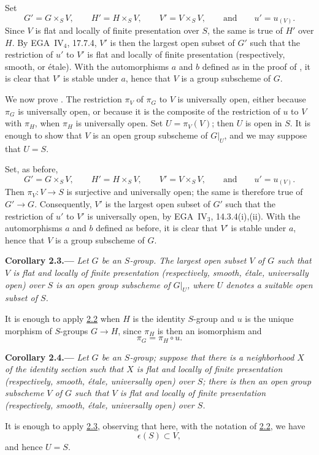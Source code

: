 Set
\[
  G'=G\times_SV,\qquad
  H'=H\times_SV,\qquad
  V'=V\times_SV,
  \qquad\text{and}\qquad
  u'=u_{(V)}.
\]
Since \(V\) is flat and locally of finite presentation over \(S\),
the same is true of \(H'\) over \(H\). By EGA~IV\(_4\), 17.7.4,
\(V'\) is then the largest open subset of \(G'\) such that the
restriction of \(u'\) to \(V'\) is flat and locally of finite
presentation (respectively, smooth, or \'etale). With the
automorphisms \(a\) and \(b\) defined as in the proof of , it
is clear that \(V'\) is stable under \(a\), hence that \(V\) is a
group subscheme of \(G\).

We now prove \textup{}. The restriction \(\pi_V\) of \(\pi_G\)
to \(V\) is universally open, either because \(\pi_G\) is
universally open, or because it is the composite of the restriction
of \(u\) to \(V\) with \(\pi_H\), when \(\pi_H\) is universally
open. Set \(U=\pi_V(V)\); then \(U\) is open in \(S\). It is enough
to show that \(V\) is an open group subscheme of \(G|_U\), and we
may suppose that \(U=S\).

Set, as before,
\[
  G'=G\times_SV,\qquad
  H'=H\times_SV,\qquad
  V'=V\times_SV,
  \qquad\text{and}\qquad
  u'=u_{(V)}.
\]
Then \(\pi_V:V\to S\) is surjective and universally open; the same
is therefore true of \(G'\to G\). Consequently, \(V'\) is the
largest open subset of \(G'\) such that the restriction of \(u'\)
to \(V'\) is universally open, by EGA~IV\(_3\), 14.3.4(i),(ii).
With the automorphisms \(a\) and \(b\) defined as before, it is
clear that \(V'\) is stable under \(a\), hence that \(V\) is a
group subscheme of \(G\).

\medskip
{}\label{cor:sga3-VIB-2.3}%
\noindent\textbf{Corollary 2.3.---}
\emph{Let \(G\) be an \(S\)-group. The largest open subset \(V\) of
\(G\) such that \(V\) is flat and locally of finite presentation
(respectively, smooth, \'etale, universally open) over \(S\) is an
open group subscheme of \(G|_U\), where \(U\) denotes a suitable open
subset of \(S\).}

It is enough to apply \hyperref[prop:sga3-VIB-2.2]{2.2} when \(H\) is the identity \(S\)-group
and \(u\) is the unique morphism of \(S\)-groups \(G\to H\), since
\(\pi_H\) is then an isomorphism and
\[
  \pi_G=\pi_H\circ u.
\]

\medskip
{}\label{cor:sga3-VIB-2.4}%
\noindent\textbf{Corollary 2.4.---}
\emph{Let \(G\) be an \(S\)-group; suppose that there is a neighborhood
\(X\) of the identity section such that \(X\) is flat and locally of
finite presentation (respectively, smooth, \'etale, universally open)
over \(S\); there is then an open group subscheme \(V\) of \(G\) such
that \(V\) is flat and locally of finite presentation (respectively,
smooth, \'etale, universally open) over \(S\).}

It is enough to apply \hyperref[cor:sga3-VIB-2.3]{2.3}, observing that here, with the notation
of \hyperref[prop:sga3-VIB-2.2]{2.2}, we have
\[
  \epsilon(S)\subset V,
\]
and hence \(U=S\).
